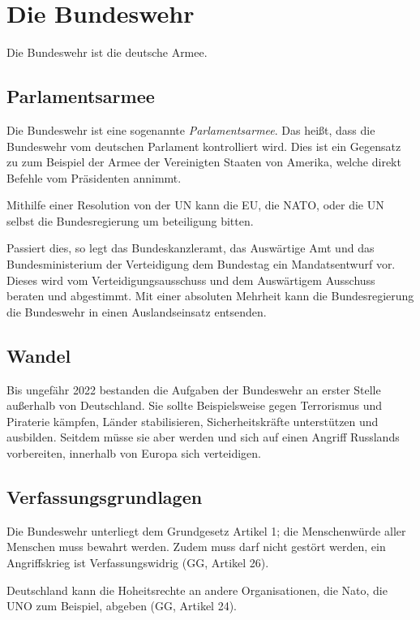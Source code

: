 \documentclass{article}
\begin{document}
\section{Die Bundeswehr}
Die Bundeswehr ist die deutsche Armee.
 
\subsection{Parlamentsarmee} 
Die Bundeswehr ist eine sogenannte \emph{Parlamentsarmee}. Das heißt, dass die Bundeswehr vom deutschen Parlament kontrolliert wird. Dies ist ein Gegensatz zu zum Beispiel der Armee der Vereinigten Staaten von Amerika, welche direkt Befehle vom Präsidenten annimmt.
 
Mithilfe einer Resolution von der UN kann die EU, die NATO, oder die UN selbst die Bundesregierung um beteiligung bitten.

Passiert dies, so legt das Bundeskanzleramt, das Auswärtige Amt und das Bundesministerium der Verteidigung dem Bundestag ein Mandatsentwurf vor. Dieses wird vom Verteidigungsausschuss und dem Auswärtigem Ausschuss beraten und abgestimmt. Mit einer absoluten Mehrheit kann die Bundesregierung die Bundeswehr in einen Auslandseinsatz entsenden.
 
\subsection{Wandel} 
Bis ungefähr 2022 bestanden die Aufgaben der Bundeswehr an erster Stelle außerhalb von Deutschland. Sie sollte Beispielsweise gegen Terrorismus und Piraterie kämpfen, Länder stabilisieren, Sicherheitskräfte unterstützen und ausbilden. Seitdem müsse sie aber  werden und sich auf einen Angriff Russlands vorbereiten, innerhalb von Europa sich verteidigen.
 
\subsection{Verfassungsgrundlagen}
Die Bundeswehr unterliegt dem Grundgesetz Artikel 1; die Menschenwürde aller Menschen muss bewahrt werden. Zudem muss darf  nicht gestört werden, ein Angriffskrieg ist Verfassungswidrig (GG, Artikel 26).
 
Deutschland kann die Hoheitsrechte an andere Organisationen, die Nato, die UNO zum Beispiel, abgeben (GG, Artikel 24).
\end{document}
